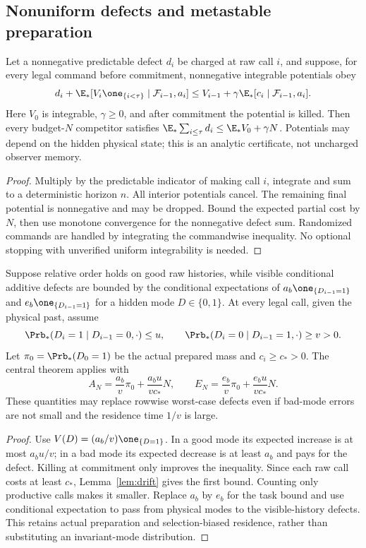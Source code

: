 \subsection*{Nonuniform defects and metastable preparation}
\begin{lemma}\label{lem:drift}
Let a nonnegative predictable defect $d_i$ be charged at raw call $i$, and suppose, for every legal command before commitment, nonnegative integrable potentials obey
\[
 d_i+\E_*[V_i\one_{\{i<\tau\}}\mid\mathcal F_{i-1},a_i]
 \le V_{i-1}+\gamma\E_*[c_i\mid\mathcal F_{i-1},a_i].
\]
Here $V_0$ is integrable, $\gamma\ge0$, and after commitment the potential is killed. Then every budget-$N$ competitor satisfies $\E_*\sum_{i\le\tau}d_i\le\E_*V_0+\gamma N$. Potentials may depend on the hidden physical state; this is an analytic certificate, not uncharged observer memory.
\end{lemma}
\begin{proof}
Multiply by the predictable indicator of making call $i$, integrate and sum to a deterministic horizon $n$. All interior potentials cancel. The remaining final potential is nonnegative and may be dropped. Bound the expected partial cost by $N$, then use monotone convergence for the nonnegative defect sum. Randomized commands are handled by integrating the commandwise inequality. No optional stopping with unverified uniform integrability is needed.
\end{proof}

\begin{corollary}\label{cor:metastable}
Suppose relative order holds on good raw histories, while visible conditional additive defects are bounded by the conditional expectations of $a_b\one_{\{D_{i-1}=1\}}$ and $e_b\one_{\{D_{i-1}=1\}}$ for a hidden mode $D\in\{0,1\}$. At every legal call, given the physical past, assume
\[
 \Prb_*(D_i=1\mid D_{i-1}=0,\cdot)\le u,
 \qquad\Prb_*(D_i=0\mid D_{i-1}=1,\cdot)\ge v>0.
\]
Let $\pi_0=\Prb_*(D_0=1)$ be the actual prepared mass and $c_i\ge c_*>0$. The central theorem applies with
\[
 A_N=\frac{a_b}{v}\pi_0+\frac{a_bu}{vc_*}N,
 \qquad E_N=\frac{e_b}{v}\pi_0+\frac{e_bu}{vc_*}N.
\]
These quantities may replace rowwise worst-case defects even if bad-mode errors are not small and the residence time $1/v$ is large.
\end{corollary}
\begin{proof}
Use $V(D)=(a_b/v)\one_{\{D=1\}}$. In a good mode its expected increase is at most $a_bu/v$; in a bad mode its expected decrease is at least $a_b$ and pays for the defect. Killing at commitment only improves the inequality. Since each raw call costs at least $c_*$, Lemma~\ref{lem:drift} gives the first bound. Counting only productive calls makes it smaller. Replace $a_b$ by $e_b$ for the task bound and use conditional expectation to pass from physical modes to the visible-history defects. This retains actual preparation and selection-biased residence, rather than substituting an invariant-mode distribution.
\end{proof}
